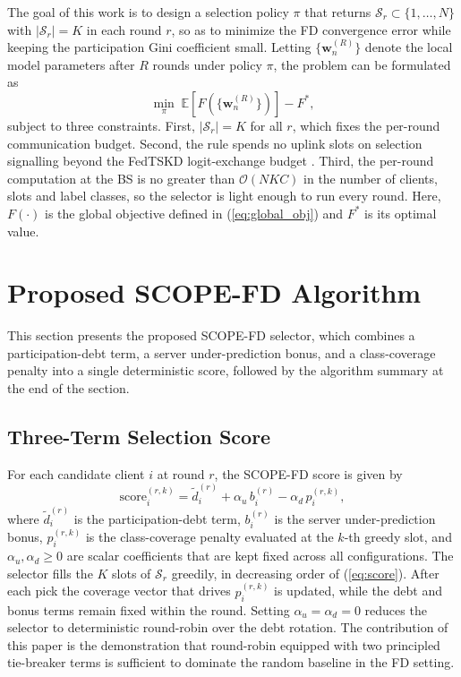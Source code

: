 \documentclass[journal]{IEEEtran}
\begin{document}
The goal of this work is to design a selection policy $\pi$ that returns $\mathcal{S}_r \subset \{1, \dots, N\}$ with $|\mathcal{S}_r| = K$ in each round $r$, so as to minimize the FD convergence error while keeping the participation Gini coefficient small. Letting $\{\bm{w}_n^{(R)}\}$ denote the local model parameters after $R$ rounds under policy $\pi$, the problem can be formulated as
\begin{equation}
\min_{\pi} \; \mathbb{E}\!\left[F\!\left(\{\bm{w}_n^{(R)}\}\right)\right] - F^{*},
\label{eq:problem}
\end{equation}
subject to three constraints. First, $|\mathcal{S}_r| = K$ for all $r$, which fixes the per-round communication budget. Second, the rule spends no uplink slots on selection signalling beyond the FedTSKD logit-exchange budget \cite{mu2024fedtskd}. Third, the per-round computation at the BS is no greater than $\mathcal{O}(NKC)$ in the number of clients, slots and label classes, so the selector is light enough to run every round. Here, $F(\cdot)$ is the global objective defined in (\ref{eq:global_obj}) and $F^{*}$ is its optimal value.

\section{Proposed SCOPE-FD Algorithm}
\label{sec:scope-alg}

This section presents the proposed SCOPE-FD selector, which combines a participation-debt term, a server under-prediction bonus, and a class-coverage penalty into a single deterministic score, followed by the algorithm summary at the end of the section.

\subsection{Three-Term Selection Score}
\label{ssec:three-term-score}

For each candidate client $i$ at round $r$, the SCOPE-FD score is given by
\begin{equation}
\text{score}_i^{(r,k)} = \tilde{d}_i^{(r)} + \alpha_u\, b_i^{(r)} - \alpha_d\, p_i^{(r,k)},
\label{eq:score}
\end{equation}
where $\tilde{d}_i^{(r)}$ is the participation-debt term, $b_i^{(r)}$ is the server under-prediction bonus, $p_i^{(r,k)}$ is the class-coverage penalty evaluated at the $k$-th greedy slot, and $\alpha_u, \alpha_d \ge 0$ are scalar coefficients that are kept fixed across all configurations. The selector fills the $K$ slots of $\mathcal{S}_r$ greedily, in decreasing order of (\ref{eq:score}). After each pick the coverage vector that drives $p_i^{(r,k)}$ is updated, while the debt and bonus terms remain fixed within the round. Setting $\alpha_u = \alpha_d = 0$ reduces the selector to deterministic round-robin over the debt rotation. The contribution of this paper is the demonstration that round-robin equipped with two principled tie-breaker terms is sufficient to dominate the random baseline in the FD setting.
\end{document}
